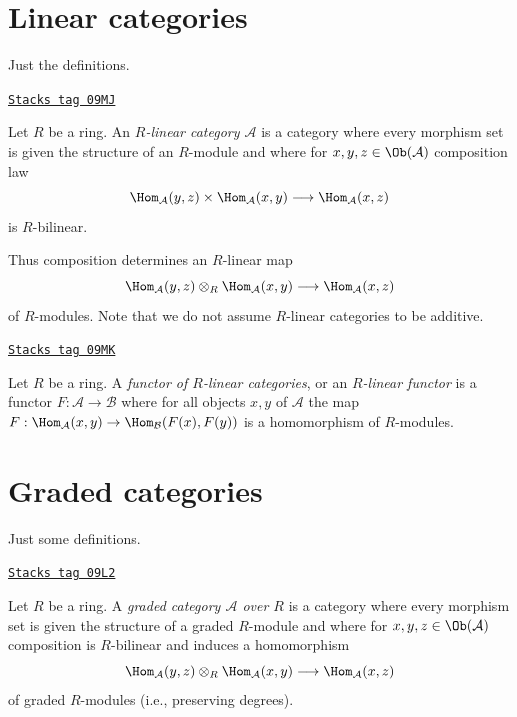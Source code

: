 \section{Linear categories}
\label{dga-section-linear}
Just the definitions.

\begin{definition}
\label{dga-definition-linear-category}
\href{https://stacks.math.columbia.edu/tag/09MJ}{\texttt{Stacks tag 09MJ}}

Let $R$ be a ring. An {\it $R$-linear category $\mathcal{A}$} is a category
where every morphism set is given the structure of an $R$-module
and where for $x, y, z \in \Ob(\mathcal{A})$ composition law
$$
\Hom_\mathcal{A}(y, z) \times \Hom_\mathcal{A}(x, y)
\longrightarrow
\Hom_\mathcal{A}(x, z)
$$
is $R$-bilinear.
\end{definition}

Thus composition determines an $R$-linear map
$$
\Hom_\mathcal{A}(y, z) \otimes_R \Hom_\mathcal{A}(x, y)
\longrightarrow
\Hom_\mathcal{A}(x, z)
$$
of $R$-modules. Note that we do not assume $R$-linear categories to be
additive.

\begin{definition}
\label{dga-definition-functor-linear-categories}
\href{https://stacks.math.columbia.edu/tag/09MK}{\texttt{Stacks tag 09MK}}

Let $R$ be a ring. A {\it functor of $R$-linear categories}, or an
{\it $R$-linear functor} is a functor $F : \mathcal{A} \to \mathcal{B}$
where for all objects $x, y$ of $\mathcal{A}$ the map
$F : \Hom_\mathcal{A}(x, y) \to \Hom_\mathcal{B}(F(x), F(y))$
is a homomorphism of $R$-modules.
\end{definition}

\section{Graded categories}
\label{dga-section-graded}
Just some definitions.

\begin{definition}
\label{dga-definition-graded-category}
\href{https://stacks.math.columbia.edu/tag/09L2}{\texttt{Stacks tag 09L2}}

Let $R$ be a ring. A {\it graded category $\mathcal{A}$
over $R$} is a category where every morphism set is given the structure
of a graded $R$-module and where for
$x, y, z \in \Ob(\mathcal{A})$ composition is $R$-bilinear and induces
a homomorphism
$$
\Hom_\mathcal{A}(y, z) \otimes_R \Hom_\mathcal{A}(x, y)
\longrightarrow
\Hom_\mathcal{A}(x, z)
$$
of graded $R$-modules (i.e., preserving degrees).
\end{definition}

